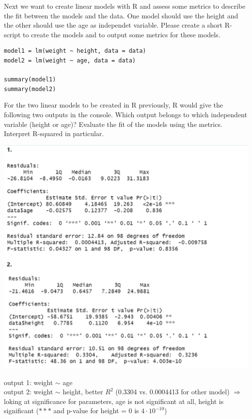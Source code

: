 \documentclass[addpoints]{exam}
\begin{document}
\begin{questions}
		\question[7] Next we want to create linear models with R and assess some metrics to describe the fit between the models and the data. One model should use the height and the other should use the age as independet variable. Please create a short R-script to create the models and to output some metrics for these models.
		\begin{solution}
			\begin{lstlisting}
model1 = lm(weight ~ height, data = data)
model2 = lm(weight ~ age, data = data)

summary(model1)
summary(model2)
			\end{lstlisting}
		\end{solution}
	
		\question[4] For the two linear models to be created in R previously, R would give the following two outputs in the console.
		Which output belongs to which independent variable (height or age)? Evaluate the fit of the models using the metrics. Interpret R-squared in particular.
		\begin{center}
			\includegraphics[scale=0.5]{r-output.png}
		\end{center}
		\begin{solution}
			output 1: weight $\sim$ age \\
			output 2: weight $\sim$ height, better $R^2$ (0.3304 vs. 0.0004413 for other model) $\Rightarrow$ loking at significance for parameters, age is not significant at all, height is significant ($\ast\ast\ast$ and p-value for height = 0 is $4\cdot 10^{-10}$)
		\end{solution}
	\end{questions}
\end{document}
